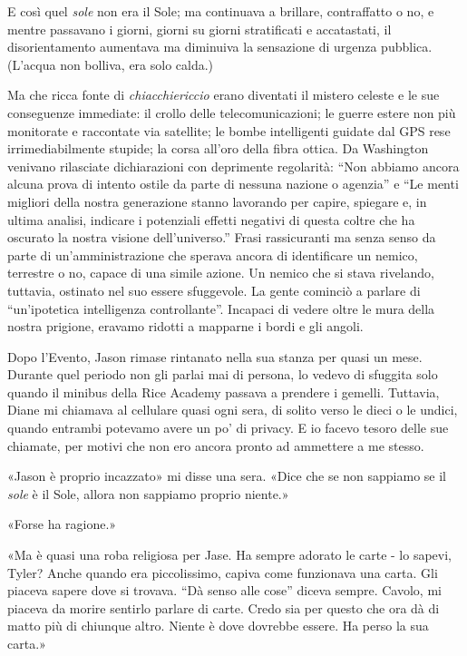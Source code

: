 \separatorefiori

E così quel \emph{sole} non era il Sole; ma continuava a brillare,
contraffatto o no, e mentre passavano i giorni, giorni su giorni
stratificati e accatastati, il disorientamento aumentava ma diminuiva la
sensazione di urgenza pubblica. (L'acqua non bolliva, era solo calda.)

Ma che ricca fonte di \emph{chiacchiericcio} erano diventati il mistero
celeste e le sue conseguenze immediate: il crollo delle
telecomunicazioni; le guerre estere non più monitorate e raccontate via
satellite; le bombe intelligenti guidate dal GPS rese irrimediabilmente
stupide; la corsa all'oro della fibra ottica. Da Washington venivano
rilasciate dichiarazioni con deprimente regolarità: ``Non abbiamo ancora
alcuna prova di intento ostile da parte di nessuna nazione o agenzia'' e
``Le menti migliori della nostra generazione stanno lavorando per
capire, spiegare e, in ultima analisi, indicare i potenziali effetti
negativi di questa coltre che ha oscurato la nostra visione
dell'universo.'' Frasi rassicuranti ma senza senso da parte di
un'amministrazione che sperava ancora di identificare un nemico,
terrestre o no, capace di una simile azione. Un nemico che si stava
rivelando, tuttavia, ostinato nel suo essere sfuggevole. La gente
cominciò a parlare di ``un'ipotetica intelligenza controllante''.
Incapaci di vedere oltre le mura della nostra prigione, eravamo ridotti
a mapparne i bordi e gli angoli.

Dopo l'Evento, Jason rimase rintanato nella sua stanza per quasi un
mese. Durante quel periodo non gli parlai mai di persona, lo vedevo di
sfuggita solo quando il minibus della Rice Academy passava a prendere i
gemelli. Tuttavia, Diane mi chiamava al cellulare quasi ogni sera, di
solito verso le dieci o le undici, quando entrambi potevamo avere un po'
di privacy. E io facevo tesoro delle sue chiamate, per motivi che non
ero ancora pronto ad ammettere a me stesso.

«Jason è proprio incazzato» mi disse una sera. «Dice che se non sappiamo
se il \emph{sole} è il Sole, allora non sappiamo proprio niente.»

«Forse ha ragione.»

«Ma è quasi una roba religiosa per Jase. Ha sempre adorato le carte - lo
sapevi, Tyler? Anche quando era piccolissimo, capiva come funzionava una
carta. Gli piaceva sapere dove si trovava. ``Dà senso alle cose'' diceva
sempre. Cavolo, mi piaceva da morire sentirlo parlare di carte. Credo
sia per questo che ora dà di matto più di chiunque altro. Niente è dove
dovrebbe essere. Ha perso la sua carta.»

